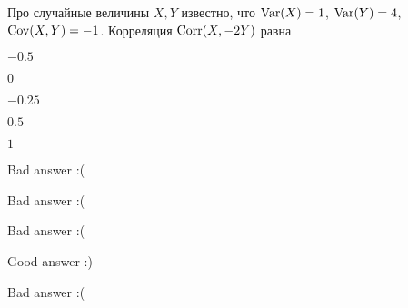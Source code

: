 
\begin{question}
Про случайные величины \(X, Y\) известно, что \(\operatorname{Var}(X)=1\),
\(\operatorname{Var}(Y)=4\), \(\operatorname{Cov}(X,Y)=-1\). Корреляция \(\operatorname{Corr}(X,-2Y)\) равна
\begin{answerlist}
  \item \(-0.5\)
  \item \(0\)
  \item \(-0.25\)
  \item \(0.5\)
  \item \(1\)
\end{answerlist}
\end{question}

\begin{solution}
\begin{answerlist}
  \item Bad answer :(
  \item Bad answer :(
  \item Bad answer :(
  \item Good answer :)
  \item Bad answer :(
\end{answerlist}
\end{solution}

